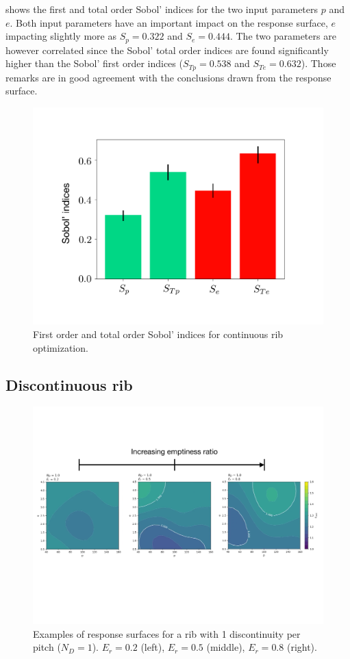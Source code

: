  shows the first and total order Sobol' indices for the two input parameters $p$ and $e$. Both input parameters have an important impact on the response surface, $e$ impacting slightly more as $S_p = 0.322$ and $S_e = 0.444$. The two parameters are however correlated since the Sobol' total order indices are found significantly higher than the Sobol' first order indices ($S_{Tp} = 0.538$ and $S_{Te} = 0.632$). Those remarks are in good agreement with the conclusions drawn from the response surface. 

\begin{figure}[h]
\centering
\includegraphics[width=0.6\linewidth,keepaspectratio]{fig/applications/optim/Sobol_continu.pdf}
\caption{First order and total order Sobol' indices for continuous rib optimization.}
\label{sensitivity2D}
\end{figure}

\subsection{Discontinuous rib}
\label{sec:discontinuous_rib}

\begin{figure}[h!]
\centering
\includegraphics[width=\linewidth,keepaspectratio]{fig/applications/optim/GP_1ND.pdf}
\caption{Examples of response surfaces for a rib with 1 discontinuity per pitch ($N_D=1$). $E_r=0.2$ (left), $E_r=0.5$ (middle), $E_r=0.8$ (right).}
\label{1D_RS}
\end{figure}

